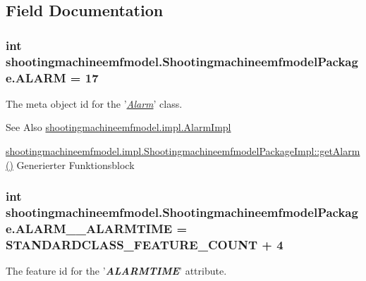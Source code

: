 \subsection{Field Documentation}
\hypertarget{interfaceshootingmachineemfmodel_1_1_shootingmachineemfmodel_package_adae05455839bcd40f9790082ac94aabc}{
\subsubsection[{A\-L\-A\-R\-M}]{\setlength{\rightskip}{0pt plus 5cm}int shootingmachineemfmodel.\-Shootingmachineemfmodel\-Package.\-A\-L\-A\-R\-M = 17}}\label{interfaceshootingmachineemfmodel_1_1_shootingmachineemfmodel_package_adae05455839bcd40f9790082ac94aabc}
The meta object id for the '\hyperlink{classshootingmachineemfmodel_1_1impl_1_1_alarm_impl}{{\itshape Alarm}}' class.

\begin{DoxySeeAlso}{See Also}
\hyperlink{classshootingmachineemfmodel_1_1impl_1_1_alarm_impl}{shootingmachineemfmodel.\-impl.\-Alarm\-Impl} 

\hyperlink{classshootingmachineemfmodel_1_1impl_1_1_shootingmachineemfmodel_package_impl_aae7572a42a9d2658df63f0aea15ccf62}{shootingmachineemfmodel.\-impl.\-Shootingmachineemfmodel\-Package\-Impl\-::get\-Alarm()} Generierter Funktionsblock 
\end{DoxySeeAlso}
\hypertarget{interfaceshootingmachineemfmodel_1_1_shootingmachineemfmodel_package_ac5eb3c5a5b86a0035eaf0b1d873ada39}{
\subsubsection[{A\-L\-A\-R\-M\-\_\-\-\_\-\-A\-L\-A\-R\-M\-T\-I\-M\-E}]{\setlength{\rightskip}{0pt plus 5cm}int shootingmachineemfmodel.\-Shootingmachineemfmodel\-Package.\-A\-L\-A\-R\-M\-\_\-\-\_\-\-A\-L\-A\-R\-M\-T\-I\-M\-E = {\bf S\-T\-A\-N\-D\-A\-R\-D\-C\-L\-A\-S\-S\-\_\-\-F\-E\-A\-T\-U\-R\-E\-\_\-\-C\-O\-U\-N\-T} + 4}}\label{interfaceshootingmachineemfmodel_1_1_shootingmachineemfmodel_package_ac5eb3c5a5b86a0035eaf0b1d873ada39}
The feature id for the '{\itshape {\bfseries A\-L\-A\-R\-M\-T\-I\-M\-E}}' attribute.

